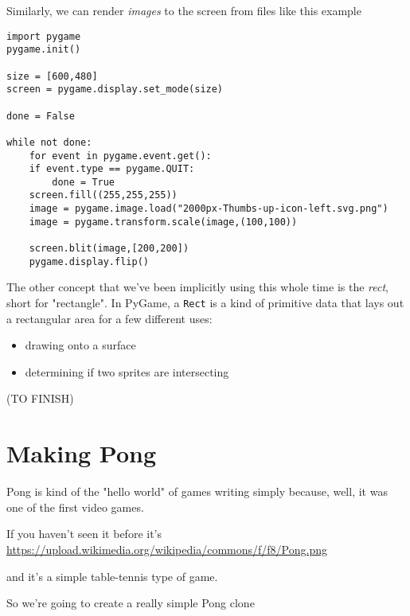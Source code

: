 \documentclass[11pt]{article}
\begin{document}
Similarly, we can render \emph{images} to the screen from files like this example

\begin{verbatim}
import pygame
pygame.init()

size = [600,480]
screen = pygame.display.set_mode(size)

done = False

while not done:
    for event in pygame.event.get():
	if event.type == pygame.QUIT:
	    done = True
    screen.fill((255,255,255))
    image = pygame.image.load("2000px-Thumbs-up-icon-left.svg.png")
    image = pygame.transform.scale(image,(100,100))

    screen.blit(image,[200,200])
    pygame.display.flip()
\end{verbatim}

The other concept that we've been implicitly using this whole time is the \emph{rect}, short for "rectangle". In PyGame, a \texttt{Rect} is a kind of primitive data that lays out a rectangular area for a few different uses:
\begin{itemize}
\item drawing onto a surface
\item determining if two sprites are intersecting
\end{itemize}

(TO FINISH)

\section{Making Pong}
\label{sec:org089b6b8}
Pong is kind of the "hello world" of games writing simply because, well, it was one of the first video games. 

If you haven't seen it before it's 
\url{https://upload.wikimedia.org/wikipedia/commons/f/f8/Pong.png}

and it's a simple table-tennis type of game. 

So we're going to create a really simple Pong clone
\end{document}
